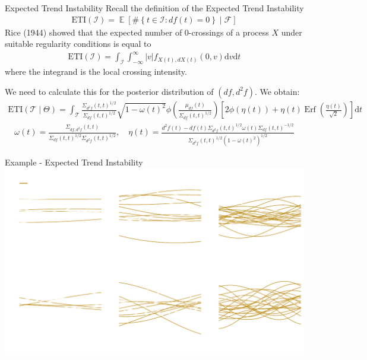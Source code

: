 \documentclass[ignorenonframetext,xcolor=pdflatex,table,dvipsnames,serif]{beamer}
\DeclareMathOperator{\E}{\mathbb{E}}
\DeclareMathOperator{\Erf}{Erf}
\begin{document}
\begin{frame}{Expected Trend Instability}
  Recall the definition of the Expected Trend Instability
  \begin{align*}
    \mathrm{ETI}(\mathcal{I}) = \E[\#\left\{t \in \mathcal{I} : df(t) = 0\right\} \mid \mathcal{F}]
  \end{align*}
  Rice (1944) showed that the expected number of 0-crossings of a process $X$ under suitable regularity conditions is equal to
  \begin{align*}
    \mathrm{ETI}(\mathcal{I}) = \int_\mathcal{I}\int_{-\infty}^\infty |v| f_{X(t), dX(t)}(0, v)\mathrm{d}v\mathrm{d}t
  \end{align*}
  where the integrand is the \alert{local crossing intensity}. 
  
  \pause
  
  \vspace{0.5cm}
  We need to calculate this for the posterior distribution of $(df, d^2\!f)$. We obtain:
{\tiny
  \begin{align*}
    \mathrm{ETI}(\mathcal{T} \mid \Theta) = \int_{\mathcal{T}} \frac{\Sigma_{d^2\!f}(t,t)^{1/2}}{\Sigma_{df}(t,t)^{1/2}} \sqrt{1 - \omega(t)^2}   \phi\left(\frac{\mu_{df}(t)}{\Sigma_{df}(t,t)^{1/2}}\right)\left[2\phi(\eta(t)) + \eta(t) \Erf\left(\frac{\eta(t)}{\sqrt{2}}\right)\right]\mathrm{d}t
  \end{align*}
  \begin{align*}
  \omega(t) = \frac{\Sigma_{df,d^2\!f}(t,t)}{\Sigma_{df}(t,t)^{1/2}\Sigma_{d^2\!f}(t,t)^{1/2}}, \quad \eta(t) = \frac{d^2\!f(t) - df(t)\Sigma_{d^2\!f}(t,t)^{1/2}\omega(t)\Sigma_{df}(t,t)^{-1/2}}{\Sigma_{d^2\!f}(t,t)^{1/2}(1 - \omega(t)^2)^{1/2}}
  \end{align*}
}
\end{frame}


\begin{frame}{Example - Expected Trend Instability}
  \center\includegraphics[scale=0.55]{ETIexample}
\end{frame}
\end{document}
